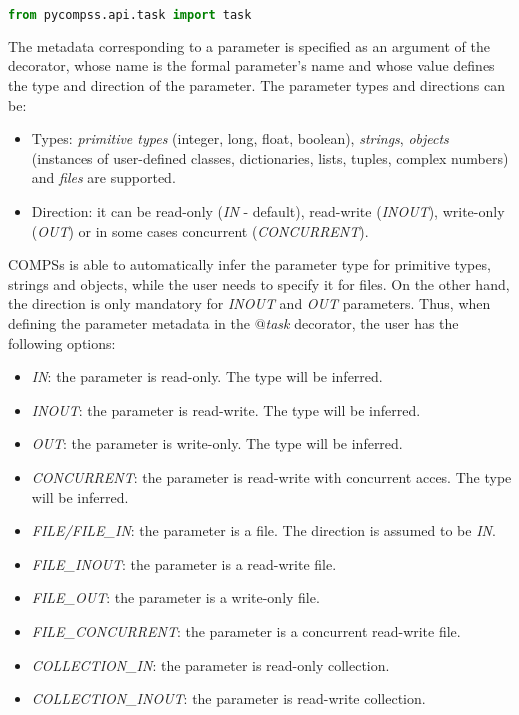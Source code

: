 \begin{lstlisting}[language=python]
from pycompss.api.task import task
\end{lstlisting}

The metadata corresponding to a parameter is specified as an argument of the decorator, whose name is 
the formal parameter's name and whose value defines the type and direction of the parameter. 
The parameter types and directions can be:

\begin{itemize}
 \item Types: {\it primitive types} (integer, long, float, boolean), {\it strings}, {\it objects} (instances of user-defined classes, dictionaries, lists, tuples, complex numbers) and {\it files} are supported.
 \item Direction: it can be read-only ({\it IN} - default), read-write ({\it INOUT}), write-only ({\it OUT}) or in some cases concurrent ({\it CONCURRENT}).
\end{itemize}

COMPSs is able to automatically infer the parameter type for primitive types, strings and objects, 
while the user needs to specify it for files. On the other hand, the direction is only mandatory for 
{\it INOUT} and {\it OUT} parameters. Thus, when defining the parameter metadata in the {\it $@$task} 
decorator, the user has the following options:

\begin{itemize}
 \item {\it IN}: the parameter is read-only. The type will be inferred.
 \item {\it INOUT}: the parameter is read-write. The type will be inferred.
 \item {\it OUT}: the parameter is write-only. The type will be inferred.
 \item {\it CONCURRENT}: the parameter is read-write with concurrent acces. The type will be inferred.
 \item {\it FILE/FILE\_IN}: the parameter is a file. The direction is assumed to be {\it IN}.
 \item {\it FILE\_INOUT}: the parameter is a read-write file.
 \item {\it FILE\_OUT}: the parameter is a write-only file.
 \item {\it FILE\_CONCURRENT}: the parameter is a concurrent read-write file.
 \item {\it COLLECTION\_IN}: the parameter is read-only collection.
 \item {\it COLLECTION\_INOUT}: the parameter is read-write collection.
\end{itemize}

